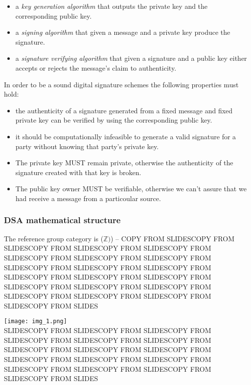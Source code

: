 \documentclass[11pt,english]{article}
\begin{document}
\begin{itemize}
\item a \textit{key generation algorithm} that outputs the private key and the corresponding public key.
\item a \textit{signing algorithm} that given a message and a private key produce the signature. 
\item a \textit{signature verifying algorithm} that given a signature and a public key either accepts or rejects the message's claim to authenticity.
\end{itemize}

In order to be a sound digital signature schemes the following properties must hold:

\begin{itemize} 
\item the authenticity of a signature generated from a fixed message and fixed private key can be verified by using the corresponding public key.
\item it should be computationally infeasible to generate a valid signature for a party without knowing that party's private key. 
\item The private key MUST remain private, otherwise the authenticity of the signature created with that key is broken.
\item The public key owner MUST be verifiable, otherwise we can't assure that we had receive a message from a particoular source.
\end{itemize}

\subsubsection{DSA mathematical structure}

The reference group category is ($\mathbb{Z})$) -- COPY FROM SLIDESCOPY FROM SLIDESCOPY FROM SLIDESCOPY FROM SLIDESCOPY FROM SLIDESCOPY FROM SLIDESCOPY FROM SLIDESCOPY FROM SLIDESCOPY FROM SLIDESCOPY FROM SLIDESCOPY FROM SLIDESCOPY FROM SLIDESCOPY FROM SLIDESCOPY FROM SLIDESCOPY FROM SLIDESCOPY FROM SLIDESCOPY FROM SLIDESCOPY FROM SLIDESCOPY FROM SLIDESCOPY FROM SLIDESCOPY FROM SLIDES

\texttt{[image: img\_1.png]} \\

SLIDESCOPY FROM SLIDESCOPY FROM SLIDESCOPY FROM SLIDESCOPY FROM SLIDESCOPY FROM SLIDESCOPY FROM SLIDESCOPY FROM SLIDESCOPY FROM SLIDESCOPY FROM SLIDESCOPY FROM SLIDESCOPY FROM SLIDESCOPY FROM SLIDESCOPY FROM SLIDESCOPY FROM SLIDESCOPY FROM SLIDESCOPY FROM SLIDES
\end{document}
